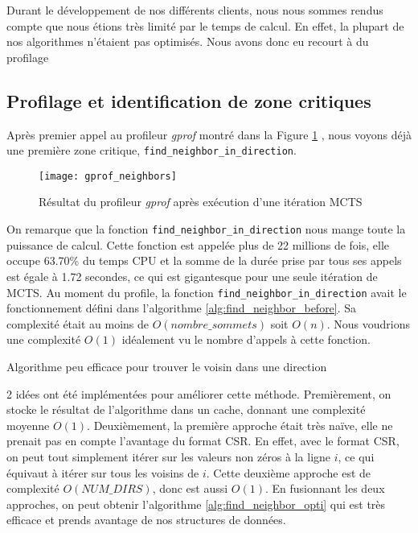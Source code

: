 Durant le développement de nos différents clients, nous nous sommes rendus
compte que nous étions très limité par le temps de calcul. En effet,
la plupart de nos algorithmes n'étaient pas optimisés. Nous avons donc
eu recourt à du profilage

\subsection{Profilage et identification de zone critiques}
Après premier appel au profileur \textit{gprof} montré dans la Figure \ref{fig:gprof-find-neighbors}
, nous voyons déjà une première zone critique, \verb|find_neighbor_in_direction|.

\begin{figure}[H]
	\texttt{[image: gprof\_neighbors]}
	\caption{Résultat du profileur \textit{gprof} après exécution d'une itération MCTS}
	\label{fig:gprof-find-neighbors}
\end{figure}

On remarque que la fonction \verb|find_neighbor_in_direction| nous mange
toute la puissance de calcul. Cette fonction est appelée plus de 22 millions de fois, elle 
occupe 63.70\% du temps CPU et la somme de la durée prise par tous ses appels est égale à 1.72 secondes, ce qui est gigantesque
pour une seule itération de MCTS. Au moment du profile, la fonction \verb|find_neighbor_in_direction| avait le fonctionnement défini
dans l'algorithme \ref{alg:find_neighbor_before}. Sa complexité était au moins de $O(nombre\_sommets)$ soit $O(n)$. Nous voudrions une complexité
$O(1)$ idéalement vu le nombre d'appels à cette fonction.

\begin{algorithm}
	\caption{Algorithme peu efficace pour trouver le voisin dans une direction}
	\label{alg:find_neighbor_before}
\end{algorithm}

2 idées ont été implémentées pour améliorer cette méthode. Premièrement, on stocke le résultat
de l'algorithme dans un cache, donnant une complexité moyenne $O(1)$. Deuxièmement, la première approche
était très naïve, elle ne prenait pas en compte l'avantage du format CSR. En effet, avec le format CSR,
on peut tout simplement itérer sur les valeurs non zéros à la ligne $i$, ce qui équivaut à itérer sur tous
les voisins de $i$. Cette deuxième approche est de complexité $O(NUM\_DIRS)$, donc est aussi $O(1)$.
En fusionnant les deux approches, on peut obtenir l'algorithme \ref{alg:find_neighbor_opti} qui est très efficace
et prends avantage de nos structures de données.

